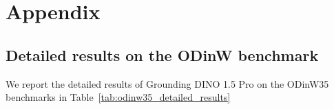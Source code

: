 \section{Appendix}
\subsection{Detailed results on the ODinW benchmark}
\label{odinw_detailed_performance}

We report the detailed results of Grounding DINO 1.5 Pro on the ODinW35 benchmarks in Table~\ref{tab:odinw35_detailed_results}


